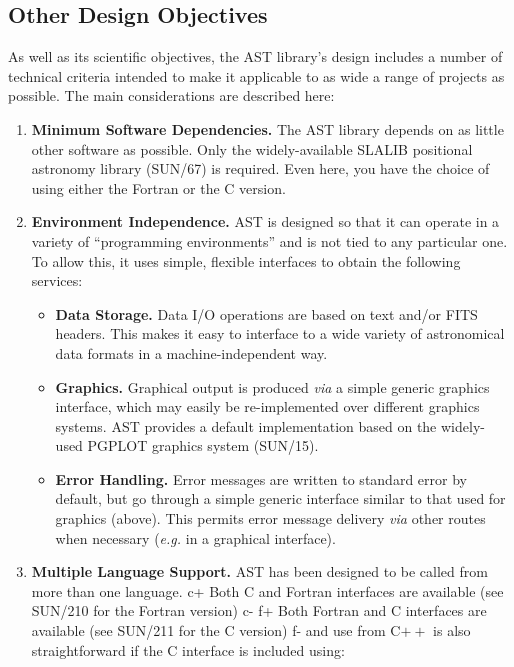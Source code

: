 \documentclass[twoside,11pt]{article}
\newcommand{\xref}[3]{#1}
\begin{document}
{\subsection{Other Design Objectives}

As well as its scientific objectives, the AST library's design
includes a number of technical criteria intended to make it applicable
to as wide a range of projects as possible. The main considerations
are described here:

\begin{enumerate}
\item {\bf{Minimum Software Dependencies.}}
The AST library depends on as little other software as possible. Only
the widely-available SLALIB positional astronomy library
(\xref{SUN/67}{sun67}{}) is required. Even here, you have the choice
of using either the Fortran or the C version.

\item {\bf{Environment Independence.}}
AST is designed so that it can operate in a variety of ``programming
environments'' and is not tied to any particular one. To allow this,
it uses simple, flexible interfaces to obtain the following services:

\begin{itemize}
\item {\bf{Data Storage.}} Data I/O operations are based on text
and/or FITS headers. This makes it easy to interface to a wide variety
of astronomical data formats in a machine-independent way.

\item {\bf{Graphics.}} Graphical output is produced {\em{via}} a
simple generic graphics interface, which may easily be re-implemented
over different graphics systems. AST provides a default implementation
based on the widely-used PGPLOT graphics system
(\xref{SUN/15}{sun15}{}).

\item {\bf{Error Handling.}} Error messages are written to standard
error by default, but go through a simple generic interface similar to
that used for graphics (above). This permits error message delivery
{\em{via}} other routes when necessary ({\em{e.g.}} in a graphical
interface).
\end{itemize}

\item {\bf{Multiple Language Support.}}
AST has been designed to be called from more than one language.
c+
Both C and Fortran interfaces are available (see
\xref{SUN/210}{sun210}{} for the Fortran version)
c-
f+
Both Fortran and C interfaces are available (see
\xref{SUN/211}{sun211}{} for the C version)
f-
and use from C$++$ is also straightforward if the C interface is
included using:


\end{enumerate}}
\end{document}
